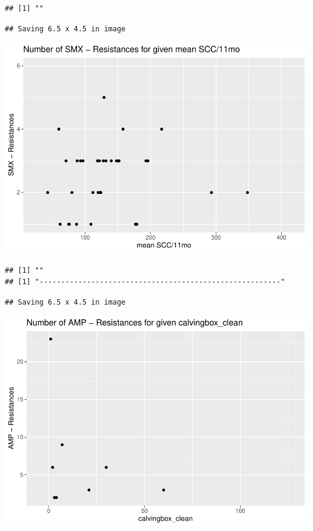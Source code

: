 \documentclass[
]{article}
\begin{document}
\begin{verbatim}
## [1] ""
\end{verbatim}

\begin{verbatim}
## Saving 6.5 x 4.5 in image
\end{verbatim}

\includegraphics{NResistenzen_files/figure-latex/numerical_variables-20.pdf}

\begin{verbatim}
## [1] ""
## [1] "--------------------------------------------------------"
\end{verbatim}

\begin{verbatim}
## Saving 6.5 x 4.5 in image
\end{verbatim}

\includegraphics{NResistenzen_files/figure-latex/numerical_variables-21.pdf}
\end{document}
